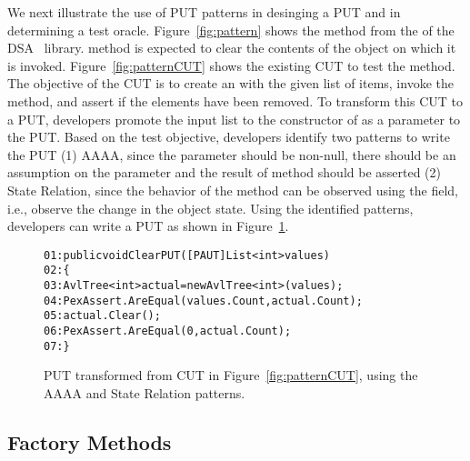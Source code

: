 We next illustrate the use of PUT patterns in desinging a PUT and in determining a test oracle. Figure~\ref{fig:pattern} shows the  method from the  of the DSA~\cite{dsa} library.  method is expected to clear the contents of the  object on which it is invoked. Figure~\ref{fig:patternCUT} shows the existing CUT to test the  method. The objective of the CUT is to create an  with the given list of items, invoke the  method, and assert if the elements have been removed. To transform this CUT to a PUT, developers promote the input list to the constructor of  as a parameter to the PUT. Based on the test objective, developers identify two patterns to write the PUT (1) AAAA, since the parameter should be non-null, there should be an assumption on the parameter and the result of  method should be asserted (2) State Relation, since the behavior of the  method can be observed using the  field, i.e., observe the change in the object state. Using the identified patterns, developers can write a PUT as shown in Figure~\ref{fig:patternPUT}. 

\begin{figure}
\begin{CodeOut}        
\begin{alltt}
01: public void ClearPUT([PAUT]List<int> values)
02: \{
03: \hspace{0.07in}AvlTree<int> actual = new AvlTree<int>(values);
04: \hspace{0.07in}PexAssert.AreEqual(values.Count, actual.Count);
05: \hspace{0.07in}actual.Clear();
06: \hspace{0.07in}PexAssert.AreEqual(0, actual.Count);
07: \}
\end{alltt}
\end{CodeOut}\vspace*{-4ex}
\caption{PUT transformed from CUT in Figure~\ref{fig:patternCUT}, using the AAAA and State Relation patterns.}%
\label{fig:patternPUT}%
\end{figure}

\subsection{Factory Methods}
\label{sec:factory}

